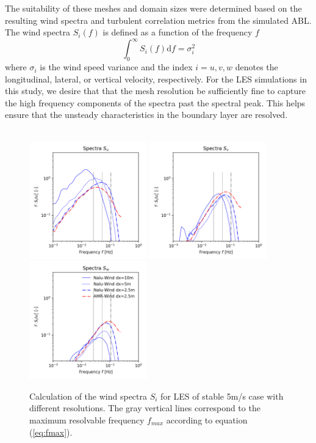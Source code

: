 The suitability of these meshes and domain sizes were determined based
on the resulting wind spectra and turbulent correlation metrics from
the simulated ABL. The wind spectra $S_i(f)$ is defined as a function
of the frequency $f$
\begin{equation}
  \int_0^\infty S_i(f) \textrm{d}f = \sigma_i^2
\end{equation}
where $\sigma_i$ is the wind speed variance and the index $i=u,v,w$
denotes the longitudinal, lateral, or vertical velocity, respectively.
For the LES simulations in this study, we desire that that the mesh
resolution be sufficiently fine to capture the high frequency
components of the spectra past the spectral peak.  This helps ensure
that the unsteady characteristics in the boundary layer are resolved.


\begin{figure}%
  \centering
  \\
  \includegraphics[width=2.0in]{figures/GridStudy_Spectra_Su.png}
  \includegraphics[width=2.0in]{figures/GridStudy_Spectra_Sv.png}
  \includegraphics[width=2.0in]{figures/GridStudy_Spectra_Sw.png}
  \caption{   \label{fig:GridStudySpectra} 
    Calculation of the wind spectra $S_i$ for LES of stable
    5m/s case with different resolutions.  The gray vertical lines
    correspond to the maximum resolvable frequency $f_{max}$ according
    to equation (\ref{eq:fmax}). }
\end{figure}

